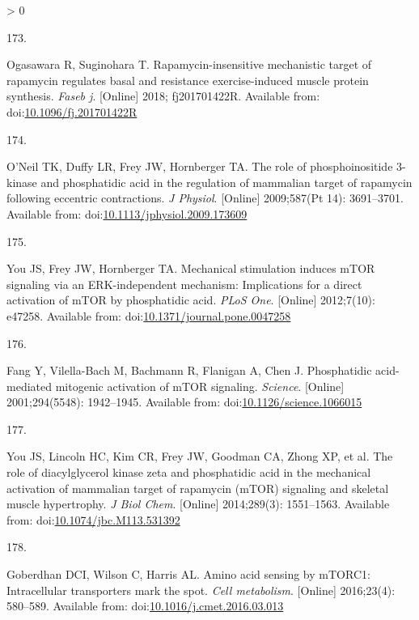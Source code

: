 \documentclass[twoside,10pt]{gihclass} %
\newlength{\cslhangindent}
\newlength{\csllabelwidth}
\newenvironment{CSLReferences}[3] %
 {%
  \setlength{\parindent}{0pt}
  \ifodd #1 \everypar{\setlength{\hangindent}{\cslhangindent}}\ignorespaces\fi
  \ifnum #2 > 0
  \setlength{\parskip}{#2\baselineskip}
  \fi
 }%
 {}
\newcommand{\CSLLeftMargin}[1]{\parbox[t]{\maxof{\widthof{#1}}{\csllabelwidth}}{#1}}
\newcommand{\CSLRightInline}[1]{\parbox[t]{\linewidth}{#1}}
\begin{document}
\begin{CSLReferences}{0}{0}
\leavevmode\hypertarget{ref-RN2836}{}%
\CSLLeftMargin{173. }
\CSLRightInline{Ogasawara R, Suginohara T. Rapamycin-insensitive mechanistic target of rapamycin regulates basal and resistance exercise-induced muscle protein synthesis. \emph{Faseb j}. {[}Online{]} 2018; fj201701422R. Available from: doi:\href{https://doi.org/10.1096/fj.201701422R}{10.1096/fj.201701422R}}

\leavevmode\hypertarget{ref-RN2844}{}%
\CSLLeftMargin{174. }
\CSLRightInline{O'Neil TK, Duffy LR, Frey JW, Hornberger TA. The role of phosphoinositide 3-kinase and phosphatidic acid in the regulation of mammalian target of rapamycin following eccentric contractions. \emph{J Physiol}. {[}Online{]} 2009;587(Pt 14): 3691--3701. Available from: doi:\href{https://doi.org/10.1113/jphysiol.2009.173609}{10.1113/jphysiol.2009.173609}}

\leavevmode\hypertarget{ref-RN2119}{}%
\CSLLeftMargin{175. }
\CSLRightInline{You JS, Frey JW, Hornberger TA. Mechanical stimulation induces mTOR signaling via an ERK-independent mechanism: Implications for a direct activation of mTOR by phosphatidic acid. \emph{PLoS One}. {[}Online{]} 2012;7(10): e47258. Available from: doi:\href{https://doi.org/10.1371/journal.pone.0047258}{10.1371/journal.pone.0047258}}

\leavevmode\hypertarget{ref-RN2126}{}%
\CSLLeftMargin{176. }
\CSLRightInline{Fang Y, Vilella-Bach M, Bachmann R, Flanigan A, Chen J. Phosphatidic acid-mediated mitogenic activation of mTOR signaling. \emph{Science}. {[}Online{]} 2001;294(5548): 1942--1945. Available from: doi:\href{https://doi.org/10.1126/science.1066015}{10.1126/science.1066015}}

\leavevmode\hypertarget{ref-RN1728}{}%
\CSLLeftMargin{177. }
\CSLRightInline{You JS, Lincoln HC, Kim CR, Frey JW, Goodman CA, Zhong XP, et al. The role of diacylglycerol kinase zeta and phosphatidic acid in the mechanical activation of mammalian target of rapamycin (mTOR) signaling and skeletal muscle hypertrophy. \emph{J Biol Chem}. {[}Online{]} 2014;289(3): 1551--1563. Available from: doi:\href{https://doi.org/10.1074/jbc.M113.531392}{10.1074/jbc.M113.531392}}

\leavevmode\hypertarget{ref-RN2848}{}%
\CSLLeftMargin{178. }
\CSLRightInline{Goberdhan DCI, Wilson C, Harris AL. Amino acid sensing by mTORC1: Intracellular transporters mark the spot. \emph{Cell metabolism}. {[}Online{]} 2016;23(4): 580--589. Available from: doi:\href{https://doi.org/10.1016/j.cmet.2016.03.013}{10.1016/j.cmet.2016.03.013}}


\end{CSLReferences}
\end{document}
